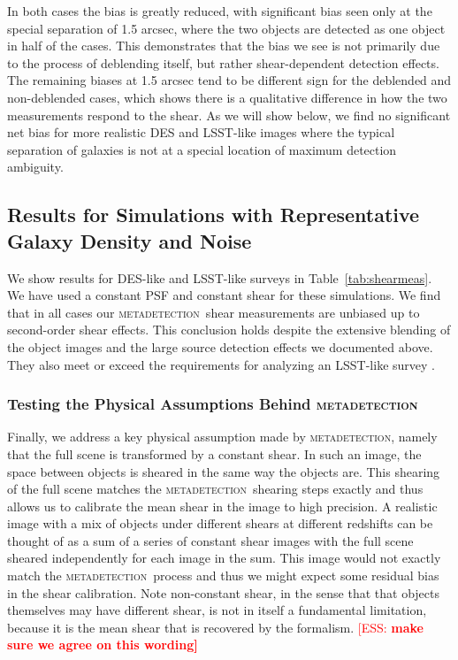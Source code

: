 \documentclass[fleqn,useAMS,usenatbib]{mnras}
\newcommand{\ess}[1]{\textcolor{red}{[ESS: \bf #1]}}
\newcommand{\mdet}{\textsc{metadetection}}
\begin{document}
In both cases the bias is greatly reduced, with significant bias seen only at
the special separation of 1.5 arcsec, where the two objects are detected as one
object in half of the cases. This demonstrates that the bias we see is not
primarily due to the process of deblending itself, but rather shear-dependent
detection effects. The remaining biases at 1.5 arcsec tend to be different sign
for the deblended and non-deblended cases, which shows there is a qualitative
difference in how the two measurements respond to the shear. As we will show
below, we find no significant net bias for more realistic DES and LSST-like
images where the typical separation of galaxies is not at a special location of
maximum detection ambiguity.

\subsection{Results for Simulations with Representative Galaxy Density and Noise}
\label{sec:res:constpsf}

We show results for DES-like and LSST-like surveys in Table~\ref{tab:shearmeas}.
We have used a constant PSF and constant shear for these simulations. We find
that in all cases our \mdet\ shear measurements are unbiased up to
second-order shear effects. This conclusion holds despite the extensive blending
of the object images and the large source detection effects we documented
above. They also meet or exceed the requirements for analyzing an LSST-like survey
\citep[e.g.,][]{huterer2006}.

\subsubsection{Testing the Physical Assumptions Behind \mdet}

Finally, we address a key physical assumption made by \mdet, namely that the
full scene is transformed by a constant shear. In such an image, the space
between objects is sheared in the same way the objects are. This shearing of
the full scene matches the \mdet\ shearing steps exactly and thus allows us to
calibrate the mean shear in the image to high precision. A realistic image with
a mix of objects under different shears at different redshifts can be thought
of as a sum of a series of constant shear images with the full scene sheared
independently for each image in the sum.  This image would not exactly match
the \mdet\ process and thus we might expect some residual bias in the shear
calibration.  Note non-constant shear, in the sense that that objects
themselves may have different shear, is not in itself a fundamental limitation,
because it is the mean shear that is recovered by the formalism.
\ess{make sure we agree on this wording}
\end{document}
